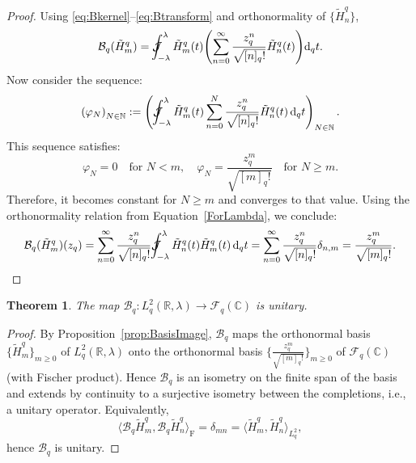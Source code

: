 \documentclass[10pt]{amsart}
\theoremstyle{plain}
\newtheorem{theorem}{Theorem}[section]
\theoremstyle{definition}
\newcommand{\Jint}{\mathcal{J}\mspace{-20mu}\int  }
\def\ge{\geqslant}
\begin{document}
\begin{proof}
Using \eqref{eq:Bkernel}–\eqref{eq:Btransform} and orthonormality of $\{\tilde H_n^q\}$,
\[
\mathcal{B}_q(\tilde{H}_m^q)
=\Jint_{-\lambda}^{\lambda}\tilde{H}_m^q(t)\!\left(\sum_{n=0}^{\infty}
\frac{z_q^n}{\sqrt{[n]_q!}}\tilde{H}_n^q(t)\right)\!\mathrm{d}_q t.
\]
Now consider the sequence:
\[
\left(\varphi_N\right)_{N \in \mathbb{N}} := 
\left( \Jint_{-\lambda}^{\lambda} \tilde{H}_m^q(t) 
\sum_{n=0}^{N} \frac{z_q^n}{\sqrt{[n]_q!}} \tilde{H}_n^q(t) \, \mathrm{d}_q t \right)_{N\in\mathbb{N}}.
\]
This sequence satisfies:
\[
\varphi_N = 0 \quad \text{for } N < m, \quad 
\varphi_N = \frac{z_q^m}{\sqrt{[m]_q!}} \quad \text{for } N \geq m.
\]
Therefore, it becomes constant for \( N \geq m \) and converges to that value. Using the orthonormality relation from Equation~\eqref{ForLambda}, we conclude:
$$\mathcal{B}_q(\tilde{H}_m^q)(z_{q}) 
= \sum_{n=0}^{\infty} \frac{z_q^n}{\sqrt{[n]_q!}} 
\Jint_{-\lambda}^{\lambda} \tilde{H}_n^q(t) \tilde{H}_m^q(t) \, \mathrm{d}_q t  
= \sum_{n=0}^{\infty} \frac{z_q^n}{\sqrt{[n]_q!}} \delta_{n,m}  
= \frac{z_q^m}{\sqrt{[m]_q!}}.
$$\end{proof}

\begin{theorem}\label{thm:unitary-B}
The map $\mathcal{B}_q:L_q^2(\mathbb{R},\lambda)\to\mathcal{F}_q(\mathbb{C})$ is unitary.
\end{theorem}

\begin{proof}
By Proposition~\ref{prop:BasisImage}, $\mathcal{B}_q$ maps the orthonormal basis
$\{\tilde H_m^q\}_{m\ge0}$ of $L_q^2(\mathbb{R},\lambda)$ onto the orthonormal basis
$\big\{\frac{z_q^m}{\sqrt{[m]_q!}}\big\}_{m\ge0}$ of $\mathcal{F}_q(\mathbb{C})$ (with Fischer product).
Hence $\mathcal{B}_q$ is an isometry on the finite span of the basis and extends by continuity
to a surjective isometry between the completions, i.e., a unitary operator.
Equivalently,
\[
\big\langle \mathcal{B}_q\tilde H_m^q,\mathcal{B}_q\tilde H_n^q\big\rangle_{\text{F}}
=\delta_{mn}
=\big\langle \tilde H_m^q,\tilde H_n^q\big\rangle_{L^2_q},
\]
hence $\mathcal{B}_q$ is unitary.
\end{proof}
\end{document}
